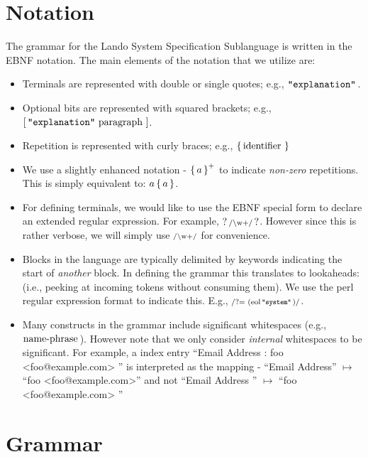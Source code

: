 \documentclass{article}
\begin{document}
\section{Notation}

The grammar for the Lando System Specification Sublanguage is written in the EBNF notation. The main elements of the notation that we utilize are:
\begin{itemize}
  \item Terminals are represented with double or single quotes; e.g., $\mathop{\texttt{"explanation"}}\,$.
  \item Optional bits are represented with squared brackets; e.g., $\mathop{\operatorname{[} \mathop{\texttt{"explanation"}}\, \mathop{\textrm{paragraph}}\, \operatorname{]}}$.
  \item Repetition is represented with curly braces; e.g., $\mathop{\operatorname{\{} \mathop{\textrm{identifier}}\, \operatorname{\}}}$
  \item We use a slightly enhanced notation - $\mathop{\operatorname{\{} a \operatorname{\}}^+}$ to indicate \emph{non-zero} repetitions. This is simply equivalent to: $a \mathop{\operatorname{\{} a \operatorname{\}}}$.
  \item For defining terminals, we would like to use the EBNF special  form to declare an extended regular expression. For example,  $\mathop{?\, \textrm{\scriptsize /\textbackslash w\\+/} \,?}$. However since this is rather verbose, we will simply use $\textrm{\scriptsize /\textrm{\textbackslash w\\+}/}$  for convenience.
  \item Blocks in the language are typically delimited by keywords indicating the start of \emph{another} block. In defining the grammar this translates to lookaheads: (i.e., peeking at incoming tokens without consuming them). We use the perl regular expression format to indicate this. E.g., $\textrm{\scriptsize /?= (\ensuremath{\mathop{\textrm{eol}}}\,\ensuremath{\mathop{\texttt{"system"}}}\,)/}$.
  \item Many constructs in the grammar include significant whitespaces (e.g., $\mathop{\textrm{name-phrase}}\,$). However note that we only consider \emph{internal} whitespaces to be significant. For example, a index entry ``Email Address : foo <foo@example.com> '' is interpreted as the mapping - ``Email Address'' $\mapsto$ ``foo <foo@example.com>'' and not ``Email Address '' $\mapsto$ ``foo <foo@example.com> ''
\end{itemize}

\newpage

\section{Grammar}
\end{document}
